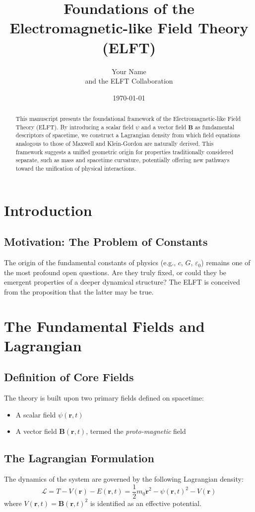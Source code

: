 \documentclass[12pt, a4paper]{article}
\title{Foundations of the Electromagnetic-like Field Theory (ELFT)}
\author{Your Name \\ and the ELFT Collaboration}
\date{\today}
\begin{document}
\maketitle

\begin{abstract}
    This manuscript presents the foundational framework of the Electromagnetic-like Field Theory (ELFT). By introducing a scalar field $\psi$ and a vector field $\mathbf{B}$ as fundamental descriptors of spacetime, we construct a Lagrangian density from which field equations analogous to those of Maxwell and Klein-Gordon are naturally derived. This framework suggests a unified geometric origin for properties traditionally considered separate, such as mass and spacetime curvature, potentially offering new pathways toward the unification of physical interactions.
\end{abstract}

\section{Introduction}
\subsection{Motivation: The Problem of Constants}
The origin of the fundamental constants of physics (e.g., $c$, $G$, $\varepsilon_0$) remains one of the most profound open questions. Are they truly fixed, or could they be emergent properties of a deeper dynamical structure? The ELFT is conceived from the proposition that the latter may be true.

\section{The Fundamental Fields and Lagrangian}

\subsection{Definition of Core Fields}
The theory is built upon two primary fields defined on spacetime:
\begin{itemize}
    \item A scalar field $\psi(\mathbf{r}, t)$
    \item A vector field $\mathbf{B}(\mathbf{r}, t)$, termed the \textit{proto-magnetic} field
\end{itemize}

\subsection{The Lagrangian Formulation}
The dynamics of the system are governed by the following Lagrangian density:
\[
\mathcal{L} = T - V(\mathbf{r}) - E(\mathbf{r},t) = \frac{1}{2}m_0 \dot{\mathbf{r}}^2 - \psi(\mathbf{r},t)^2 - V(\mathbf{r})
\]
where $V(\mathbf{r}, t) = \mathbf{B}(\mathbf{r},t)^2$ is identified as an effective potential.
\end{document}
